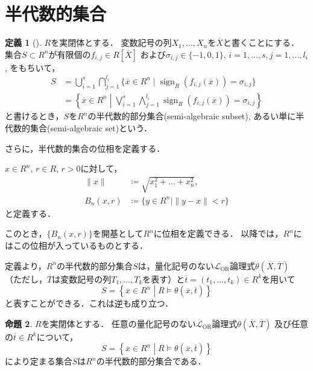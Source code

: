\documentclass[uplatex, dvipdfmx]{jsarticle}
\numberwithin{equation}{section}
\newcommand{\norm}[1]{\| {#1} \|}
\DeclareMathOperator{\sign}{sign}
\theoremstyle{definition}
\newtheorem{definition}{定義}[section]
\newtheorem{proposition}[definition]{命題}
\begin{document}
\section{半代数的集合}
\begin{definition}[{\cite[Definition 2.1.4]{MR1659509}}]
     $R$を実閉体とする．
     変数記号の列$X_1, \dots, X_n$を$\overline{X}$と書くことにする．
     集合$S \subset R^n$が有限個の$f_{i,j} \in R\left[\overline{X}\right]$
     および$\sigma_{i,j} \in \{-1, 0 ,1\}$, $i=1, \dots, s, j = 1, \dots, l_i$, をもちいて，
     \begin{align}
          S &= \bigcup_{i=1}^s \bigcap_{j=1}^{l_i} \{\overline{x} \in R^n \mid \sign_R(f_{i,j}(\overline{x})) = \sigma_{i,j}\}\\
            &= \left\{ \overline{x} \in R^n \middle| \bigvee_{i=1}^s \bigwedge_{j=1}^{l_i} \sign_R(f_{i,j}(\overline{x})) = \sigma_{i,j} \right\}
     \end{align}
     と書けるとき，$S$を$R^n$の半代数的部分集合(semi-algebraic subset), あるい単に半代数的集合(semi-algebraic set)という．
\end{definition}

さらに，半代数的集合の位相を定義する．

$x \in R^n$, $r \in R$, $r>0$に対して，
\begin{align}
     \norm{x} &\coloneqq \sqrt{x_1^2 + \dots + x_n^2},\\
     B_n(x,r) &\coloneqq \{y \in R^n \mid \norm{y-x} < r\}
\end{align}
と定義する．

このとき，$\{B_n(x,r)\}$を開基として$R^n$に位相を定義できる．
以降では，$R^n$にはこの位相が入っているものとする．

定義より，$R^n$の半代数的部分集合$S$は，量化記号のない$\mathcal{L}_\mathrm{OR}$論理式$\theta\left( \overline{X}, \overline{T} \right)$ 
（ただし，$\overline{T}$は変数記号の列$T_1, \dots, T_k$を表す）と$\overline{t} = (t_1, \dots, t_k) \in R^k$を用いて
\begin{equation}
     S = \left\{ \overline{x} \in R^n \middle| R \models \theta(\overline{x}, \overline{t}) \right\}
\end{equation}
と表すことができる．これは逆も成り立つ．

\begin{proposition} \label{proposition:semi-algebraic-set}
     $R$を実閉体とする．
     任意の量化記号のない$\mathcal{L}_\mathrm{OR}$論理式$\theta\left( \overline{X}, \overline{T} \right)$
     及び任意の$\overline{t} \in R^k$について，
     \begin{equation}
          S = \left\{ \overline{x} \in R^n \middle| R \models \theta(\overline{x}, \overline{t}) \right\}
     \end{equation}
     により定まる集合$S$は$R^n$の半代数的部分集合である．
\end{proposition}
\end{document}
